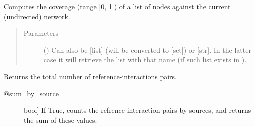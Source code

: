 \documentclass[letterpaper,10pt,english]{sphinxmanual}
\begin{document}
\begin{fulllineitems}
\begin{fulllineitems}
\label{\detokenize{main:pypath.main.PyPath.coverage}}
Computes the coverage (range {[}0, 1{]}) of a list of nodes against
the current (undirected) network.
\begin{quote}\begin{description}
\item[{Parameters}] \leavevmode
{} () \textendash{} Can also be {[}list{]} (will be converted to {[}set{]}) or {[}str{]}. In
the latter case it will retrieve the list with that name (if
such list exists in ).

\end{description}\end{quote}

\end{fulllineitems}


\begin{fulllineitems}
\label{\detokenize{main:pypath.main.PyPath.curation_effort}}
Returns the total number of reference-interactions pairs.
\begin{description}
\item[{@sum\_by\_source}] \leavevmode{[}bool{]}
If True, counts the refrence-interaction pairs by
sources, and returns the sum of these values.

\end{description}

\end{fulllineitems}


\begin{fulllineitems}
\label{\detokenize{main:pypath.main.PyPath.curation_stats}}
\end{fulllineitems}


\begin{fulllineitems}
\label{\detokenize{main:pypath.main.PyPath.curation_tab}}
\end{fulllineitems}


\end{fulllineitems}
\end{document}
